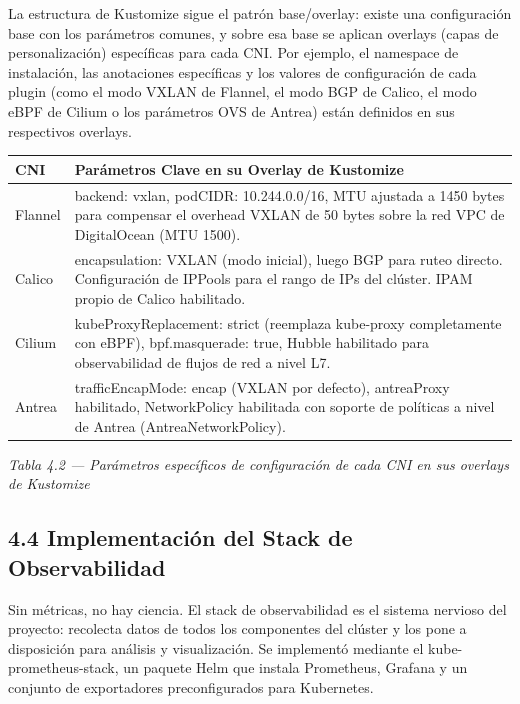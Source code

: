 \documentclass[journal]{IEEEtran}
\begin{document}
La estructura de Kustomize sigue el patrón base/overlay: existe una configuración base con los parámetros comunes, y sobre esa base se aplican overlays (capas de personalización) específicas para cada CNI. Por ejemplo, el namespace de instalación, las anotaciones específicas y los valores de configuración de cada plugin (como el modo VXLAN de Flannel, el modo BGP de Calico, el modo eBPF de Cilium o los parámetros OVS de Antrea) están definidos en sus respectivos overlays.

\begin{table}[htbp]
\centering
\scriptsize
\begin{tabularx}{\textwidth}{|Y|Y|}
\hline
\textbf{CNI} & \textbf{Parámetros Clave en su Overlay de Kustomize} \\
\hline
Flannel & backend: vxlan, podCIDR: 10.244.0.0/16, MTU ajustada a 1450 bytes para compensar el overhead VXLAN de 50 bytes sobre la red VPC de DigitalOcean (MTU 1500). \\
Calico & encapsulation: VXLAN (modo inicial), luego BGP para ruteo directo. Configuración de IPPools para el rango de IPs del clúster. IPAM propio de Calico habilitado. \\
Cilium & kubeProxyReplacement: strict (reemplaza kube-proxy completamente con eBPF), bpf.masquerade: true, Hubble habilitado para observabilidad de flujos de red a nivel L7. \\
Antrea & trafficEncapMode: encap (VXLAN por defecto), antreaProxy habilitado, NetworkPolicy habilitada con soporte de políticas a nivel de Antrea (AntreaNetworkPolicy). \\
\hline
\end{tabularx}
\end{table}

\begin{center}\emph{\emph{Tabla 4.2 --- Parámetros específicos de configuración de cada CNI en sus overlays de Kustomize}}\end{center}

\subsection{4.4 Implementación del Stack de Observabilidad}

Sin métricas, no hay ciencia. El stack de observabilidad es el sistema nervioso del proyecto: recolecta datos de todos los componentes del clúster y los pone a disposición para análisis y visualización. Se implementó mediante el kube-prometheus-stack, un paquete Helm que instala Prometheus, Grafana y un conjunto de exportadores preconfigurados para Kubernetes.
\end{document}
